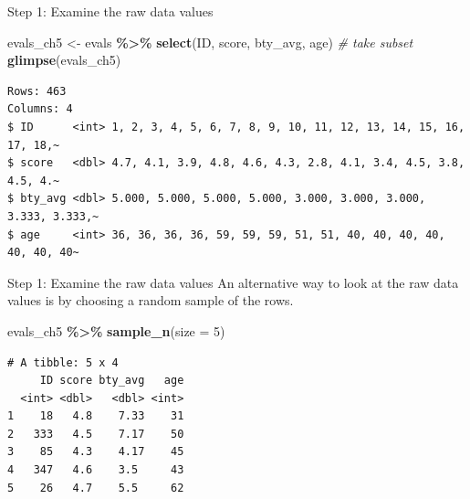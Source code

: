 \documentclass[
  ignorenonframetext,
]{beamer}
\newenvironment{Shaded}{\begin{snugshade}}{\end{snugshade}}
\newcommand{\AttributeTok}[1]{\textcolor[rgb]{0.13,0.29,0.53}{#1}}
\newcommand{\CommentTok}[1]{\textcolor[rgb]{0.56,0.35,0.01}{\textit{#1}}}
\newcommand{\DecValTok}[1]{\textcolor[rgb]{0.00,0.00,0.81}{#1}}
\newcommand{\FunctionTok}[1]{\textcolor[rgb]{0.13,0.29,0.53}{\textbf{#1}}}
\newcommand{\NormalTok}[1]{#1}
\newcommand{\OtherTok}[1]{\textcolor[rgb]{0.56,0.35,0.01}{#1}}
\newcommand{\SpecialCharTok}[1]{\textcolor[rgb]{0.81,0.36,0.00}{\textbf{#1}}}
\begin{document}
\begin{frame}[fragile]{Step 1: Examine the raw data values}
\protect\hypertarget{step-1-examine-the-raw-data-values}{}
\normalsize

\begin{Shaded}
\begin{Highlighting}[]
\NormalTok{evals\_ch5 }\OtherTok{\textless{}{-}}\NormalTok{ evals }\SpecialCharTok{\%\textgreater{}\%}
  \FunctionTok{select}\NormalTok{(ID, score, bty\_avg, age)   }\CommentTok{\# take subset}
\FunctionTok{glimpse}\NormalTok{(evals\_ch5)}
\end{Highlighting}
\end{Shaded}

\begin{verbatim}
Rows: 463
Columns: 4
$ ID      <int> 1, 2, 3, 4, 5, 6, 7, 8, 9, 10, 11, 12, 13, 14, 15, 16, 17, 18,~
$ score   <dbl> 4.7, 4.1, 3.9, 4.8, 4.6, 4.3, 2.8, 4.1, 3.4, 4.5, 3.8, 4.5, 4.~
$ bty_avg <dbl> 5.000, 5.000, 5.000, 5.000, 3.000, 3.000, 3.000, 3.333, 3.333,~
$ age     <int> 36, 36, 36, 36, 59, 59, 59, 51, 51, 40, 40, 40, 40, 40, 40, 40~
\end{verbatim}

\normalsize
\end{frame}

\begin{frame}[fragile]{Step 1: Examine the raw data values}
\protect\hypertarget{step-1-examine-the-raw-data-values-1}{}
An alternative way to look at the raw data values is by choosing a
random sample of the rows.

\normalsize

\begin{Shaded}
\begin{Highlighting}[]
\NormalTok{evals\_ch5 }\SpecialCharTok{\%\textgreater{}\%}
  \FunctionTok{sample\_n}\NormalTok{(}\AttributeTok{size =} \DecValTok{5}\NormalTok{)}
\end{Highlighting}
\end{Shaded}

\begin{verbatim}
# A tibble: 5 x 4
     ID score bty_avg   age
  <int> <dbl>   <dbl> <int>
1    18   4.8    7.33    31
2   333   4.5    7.17    50
3    85   4.3    4.17    45
4   347   4.6    3.5     43
5    26   4.7    5.5     62
\end{verbatim}

\normalsize
\end{frame}
\end{document}
